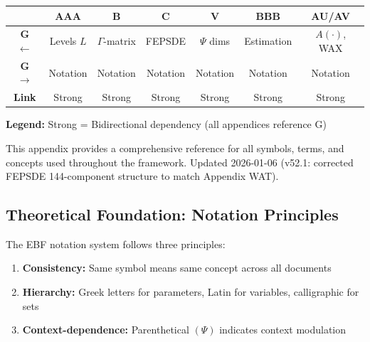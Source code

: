 
\begin{tcolorbox}[colback=white, colframe=black,
    title=\textbf{Cross-Reference Map}]

\begin{center}
\small
\begin{tabular}{@{}c|cccccc@{}}
\toprule
& \textbf{AAA} & \textbf{B} & \textbf{C} & \textbf{V} & \textbf{BBB} & \textbf{AU/AV} \\
\midrule
\textbf{G $\leftarrow$} & Levels $L$ & $\Gamma$-matrix & FEPSDE & $\Psi$ dims & Estimation & $A(\cdot)$, WAX \\
\textbf{G $\rightarrow$} & Notation & Notation & Notation & Notation & Notation & Notation \\
\midrule
\textbf{Link} & \cellcolor{red!20}Strong & \cellcolor{red!20}Strong & \cellcolor{red!20}Strong & \cellcolor{red!20}Strong & \cellcolor{red!20}Strong & \cellcolor{red!20}Strong \\
\bottomrule
\end{tabular}
\end{center}

\textbf{Legend:}
\colorbox{red!20}{Strong} = Bidirectional dependency (all appendices reference G)

\end{tcolorbox}

This appendix provides a comprehensive reference for all symbols, terms, and concepts used throughout the framework. Updated 2026-01-06 (v52.1: corrected FEPSDE 144-component structure to match Appendix WAT).

\subsection{Theoretical Foundation: Notation Principles}
\label{sec:glossary-theory}

The EBF notation system follows three principles:

\begin{enumerate}
    \item \textbf{Consistency:} Same symbol means same concept across all documents
    \item \textbf{Hierarchy:} Greek letters for parameters, Latin for variables, calligraphic for sets
    \item \textbf{Context-dependence:} Parenthetical $(\Psi)$ indicates context modulation
\end{enumerate}

